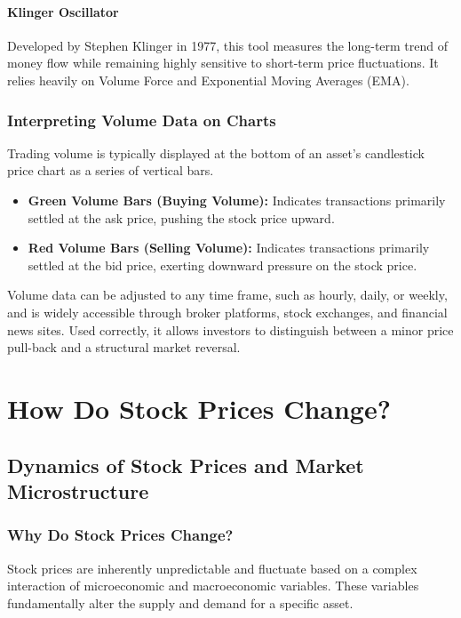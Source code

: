 \documentclass[12pt,openany]{book}
\begin{document}
\paragraph{Klinger Oscillator}
Developed by Stephen Klinger in 1977, this tool measures the long-term trend of money flow while remaining highly sensitive to short-term price fluctuations. It relies heavily on Volume Force and Exponential Moving Averages (EMA).

\subsubsection{Interpreting Volume Data on Charts}
Trading volume is typically displayed at the bottom of an asset's candlestick price chart as a series of vertical bars.

\begin{itemize}[leftmargin=*]
    \item \textbf{Green Volume Bars (Buying Volume):} Indicates transactions primarily settled at the ask price, pushing the stock price upward.
    \item \textbf{Red Volume Bars (Selling Volume):} Indicates transactions primarily settled at the bid price, exerting downward pressure on the stock price.
\end{itemize}

Volume data can be adjusted to any time frame, such as hourly, daily, or weekly, and is widely accessible through broker platforms, stock exchanges, and financial news sites. Used correctly, it allows investors to distinguish between a minor price pull-back and a structural market reversal.


\section{How Do Stock Prices Change?}

\subsection{Dynamics of Stock Prices and Market Microstructure}

\subsubsection{Why Do Stock Prices Change?}
Stock prices are inherently unpredictable and fluctuate based on a complex interaction of microeconomic and macroeconomic variables. These variables fundamentally alter the supply and demand for a specific asset.
\end{document}
